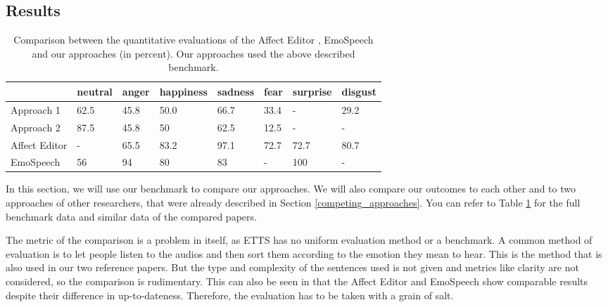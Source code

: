 \documentclass[11pt]{article}
\begin{document}
\subsection{Results}
\begin{table}[t]

\centering
\vspace{5px}
{
\begin{tabular}{|p{2cm}|p{1.5cm}|p{1.5cm}|p{1.5cm}|p{1.5cm}|p{1.5cm}|p{1.5cm}|p{1.5cm}|}
\hline
\rowcolor{mintgreen}&neutral&anger&happiness&sadness&fear&surprise&disgust\\
\hline
\cellcolor{gainsboro}Approach 1&62.5&45.8&50.0&66.7&33.4&-&29.2\\
\hline
\cellcolor{gainsboro}Approach 2&87.5&45.8&50&62.5&12.5&-&-\\
\hline
\hline
\cellcolor{gainsboro}Affect Editor& -&65.5&83.2&97.1&72.7&72.7&80.7\\
\hline
\cellcolor{gainsboro}EmoSpeech&56 &94&80 &83&-&100&-\\
\hline
\end{tabular}
}

\caption{Comparison between the quantitative evaluations of the Affect Editor \cite{cahn_generation_2000}, EmoSpeech \cite{diatlova_emospeech_2023} and our approaches (in percent). Our approaches used the above described benchmark.}
\label{Tabelle}
\end{table}
In this section, we will use our benchmark to compare our approaches. We will also compare our outcomes to each other and to two approaches of other researchers, that were already described in Section \ref{competing_approaches}. You can refer to Table \ref{Tabelle} for the full benchmark data and similar data of the compared papers.

The metric of the comparison is a problem in itself, as ETTS has no uniform evaluation method or a benchmark. A common method of evaluation is to let people listen to the audios and then sort them according to the emotion they mean to hear. This is the method that is also used in our two reference papers. But the type and complexity of the sentences used is not given and metrics like clarity are not considered, so the comparison is rudimentary. This can also be seen in that the Affect Editor \cite{cahn_generation_2000} and EmoSpeech \cite{diatlova_emospeech_2023} show comparable results despite their difference in up-to-dateness. Therefore, the evaluation has to be taken with a grain of salt.
\end{document}
